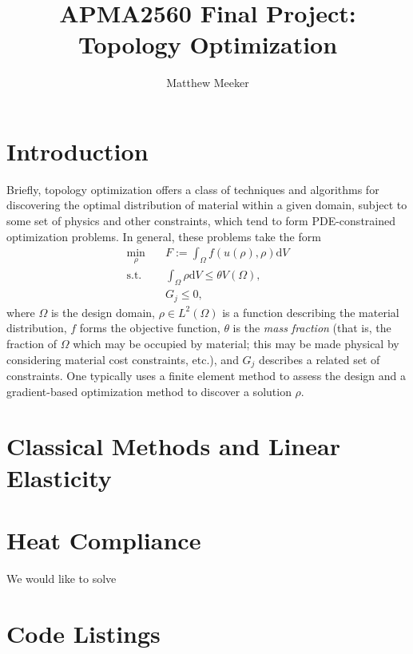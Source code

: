 \documentclass{amsart}
\title{APMA2560 Final Project: Topology Optimization}
\author{Matthew Meeker}
\begin{document}
\maketitle

\section{Introduction}

Briefly, topology optimization offers a class of techniques and algorithms for discovering the optimal distribution of
material within a given domain, subject to some set of physics and other constraints, which tend to form
PDE-constrained optimization problems. In general, these problems take the form
\begin{equation}
    \begin{aligned}
        \min_{\rho} &\quad F:=\int_\Omega f(u(\rho), \rho)\mathrm{d}V\\
        \text{s.t.} &\quad \int_\Omega \rho \mathrm{d}V \leq \theta V(\Omega),\\
         &\quad G_j \leq 0,
    \end{aligned}
\end{equation}
where $\Omega$ is the design domain, $\rho \in L^2(\Omega)$ is a function describing the material distribution,
$f$ forms the objective function, $\theta$ is the \textit{mass fraction} (that is, the fraction of $\Omega$
which may be occupied by material; this may be made physical by considering material cost constraints, etc.),
and $G_j$ describes a related set of constraints. One typically uses a finite element method to assess the design
and a gradient-based optimization method to discover a solution $\rho$.

\tableofcontents

\section{Classical Methods and Linear Elasticity}


\section{Heat Compliance}

We would like to solve





\printbibliography

\appendix
\section{Code Listings}

\end{document}
